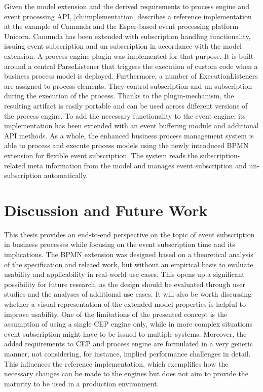 Given the model extension and the derived requirements to process engine and event processing API, \autoref{ch:implementation} describes a reference implementation at the example of Camunda and the Esper-based event processing platform Unicorn.
Camunda has been extended with subscription handling functionality, issuing event subscription and un-subscription in accordance with the model extension.
A process engine plugin was implemented for that purpose. It is built around a central ParseListener that triggers the execution of custom code when a business process model is deployed. Furthermore, a number of ExecutionListeners are assigned to process elements. They control subscription and un-subscription during the execution of the process.
Thanks to the plugin-mechanism, the resulting artifact is easily portable and can be used across different versions of the process engine.
To add the necessary functionality to the event engine, its implementation has been extended with an event buffering module and additional API methods.
As a whole, the enhanced business process management system is able to process and execute process models using the newly introduced BPMN extension for flexible event subscription.
The system reads the subscription-related meta information from the model and manages event subscription and un-subscription automatically.


\section*{Discussion and Future Work}
This thesis provides an end-to-end perspective on the topic of event subscription in business processes while focusing on the event subscription time and its implications.
The BPMN extension was designed based on a theoretical analysis of the specification and related work, but without an empirical basis to evaluate usability and applicability in real-world use cases.
This opens up a significant possibility for future research, as the design should be evaluated through user studies and the analyses of additional use cases. It will also be worth discussing whether a visual representation of the extended model properties is helpful to improve usability.
One of the limitations of the presented concept is the assumption of using a single CEP engine only, while in more complex situations event subscription might have to be issued to multiple systems.
Moreover, the added requirements to CEP and process engine are formulated in a very generic manner, not considering, for instance, implied performance challenges in detail.
This influences the reference implementation, which exemplifies how the necessary changes can be made to the engines but does not aim to provide the maturity to be used in a production environment.

